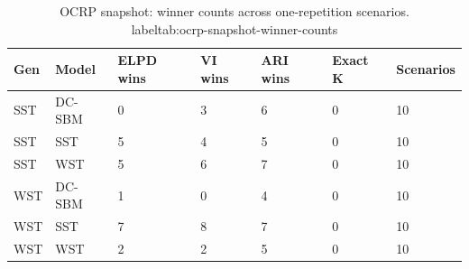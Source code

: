 \begin{table}[!h]
\centering
\caption{OCRP snapshot: winner counts across one-repetition scenarios.\\label{tab:ocrp-snapshot-winner-counts}}
\centering
\begin{tabular}[t]{lllllll}
\toprule
Gen & Model & ELPD wins & VI wins & ARI wins & Exact K & Scenarios\\
\midrule
SST & DC-SBM & 0 & 3 & 6 & 0 & 10\\
SST & SST & 5 & 4 & 5 & 0 & 10\\
SST & WST & 5 & 6 & 7 & 0 & 10\\
WST & DC-SBM & 1 & 0 & 4 & 0 & 10\\
WST & SST & 7 & 8 & 7 & 0 & 10\\
WST & WST & 2 & 2 & 5 & 0 & 10\\
\bottomrule
\end{tabular}
\end{table}
